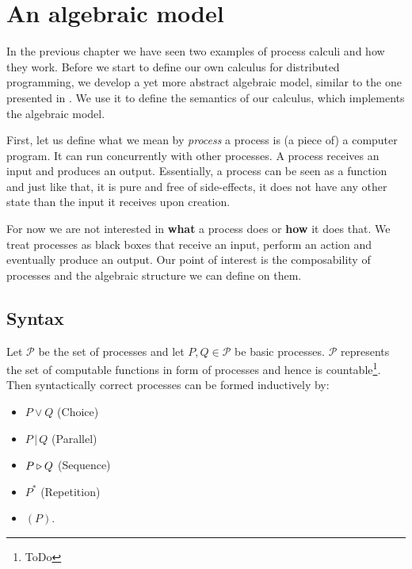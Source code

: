 \chapter{An algebraic model}
\label{chp:algebraic_model}
In the previous chapter we have seen two examples of process calculi and how they work. Before we start to define our own calculus for distributed programming, we develop a yet more abstract algebraic model, similar to the one presented in \cite{Hoare:2012:LPU:2368298.2368301}. We use it to define the semantics of our calculus, which implements the algebraic model.

First, let us define what we mean by \textit{process} a process is (a piece of) a computer program. It can run concurrently with other processes. A process receives an input and produces an output. Essentially, a process can be seen as a function and just like that, it is pure and free of side-effects, it does not have any other state than the input it receives upon creation.

For now we are not interested in \textbf{what} a process does or \textbf{how} it does that. We treat processes as black boxes that receive an input, perform an action and eventually produce an output. Our point of interest is the composability of processes and the algebraic structure we can define on them.

\section{Syntax}
\label{chp:syntax}
Let $\mathcal{P}$ be the set of processes and let $P, Q \in \mathcal{P}$ be basic processes. $\mathcal{P}$ represents the set of computable functions in form of processes and hence is countable\footnote{ToDo}. Then syntactically correct processes can be formed inductively by:
\begin{itemize}
  \item $P \vee Q$ \hspace*{2em} (Choice)
  \vspace*{-0.25em}
  \item $P \,|\, Q$ \hspace*{2.5em} (Parallel)
  \vspace*{-0.25em}
  \item $P \triangleright Q$ \hspace*{2.2em} (Sequence)
  \vspace*{-0.25em}
  \item $P^*$ \hspace*{3.5em} (Repetition)
  \vspace*{-0.25em}
  \item $\left( P \right)$.
\end{itemize}

